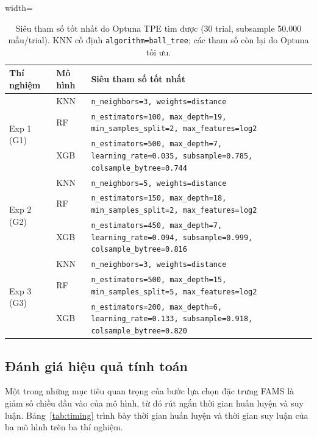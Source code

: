 \begin{table}[!t]
\caption{Siêu tham số tốt nhất do Optuna TPE tìm được (30 trial, subsample 50.000 mẫu/trial). KNN cố định \texttt{algorithm=ball\_tree}; các tham số còn lại do Optuna tối ưu.}
\label{tab:optuna_params}
\begin{center}
\begin{adjustbox}{width=\textwidth}
\begin{tabular}{|l|l|l|}
\hline
\textbf{Thí nghiệm} & \textbf{Mô hình} & \textbf{Siêu tham số tốt nhất} \\
\hline
\multirow{3}{*}{Exp 1 (G1)} & KNN & \texttt{n\_neighbors=3, weights=distance} \\
 & RF  & \texttt{n\_estimators=100, max\_depth=19, min\_samples\_split=2, max\_features=log2} \\
 & XGB & \texttt{n\_estimators=500, max\_depth=7, learning\_rate=0.035, subsample=0.785, colsample\_bytree=0.744} \\
\hline
\multirow{3}{*}{Exp 2 (G2)} & KNN & \texttt{n\_neighbors=5, weights=distance} \\
 & RF  & \texttt{n\_estimators=150, max\_depth=18, min\_samples\_split=2, max\_features=log2} \\
 & XGB & \texttt{n\_estimators=450, max\_depth=7, learning\_rate=0.094, subsample=0.999, colsample\_bytree=0.816} \\
\hline
\multirow{3}{*}{Exp 3 (G3)} & KNN & \texttt{n\_neighbors=3, weights=distance} \\
 & RF  & \texttt{n\_estimators=500, max\_depth=15, min\_samples\_split=5, max\_features=log2} \\
 & XGB & \texttt{n\_estimators=200, max\_depth=6, learning\_rate=0.133, subsample=0.918, colsample\_bytree=0.820} \\
\hline
\end{tabular}
\end{adjustbox}
\end{center}
\end{table}

\subsection{Đánh giá hiệu quả tính toán}

Một trong những mục tiêu quan trọng của bước lựa chọn đặc trưng FAMS là giảm số chiều đầu vào của mô hình, từ đó rút ngắn thời gian huấn luyện và suy luận. Bảng~\ref{tab:timing} trình bày thời gian huấn luyện và thời gian suy luận của ba mô hình trên ba thí nghiệm.

